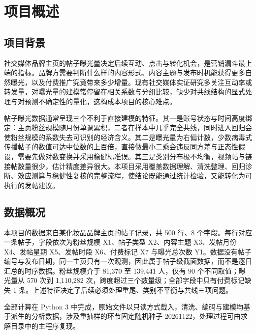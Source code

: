 \section{项目概述}
\subsection{项目背景}

社交媒体品牌主页的帖子曝光量决定后续互动、点击与转化机会，是营销漏斗最上端的指标。品牌方需要判断什么样的内容形式、内容主题与发布时机能获得更多自然曝光，以及付费推广究竟带来多少增量。现有社交媒体实证研究多关注互动率或转发量，对曝光量的建模常停留在相关系数与分组比较，缺少对共线结构的显式处理与对预测不确定性的量化，这构成本项目的核心难点。

帖子曝光数据通常呈现三个不利于直接建模的特征。其一是账号状态与时间高度绑定：主页粉丝规模随月份单调累积，二者在样本中几乎完全共线，同时进入回归会使粉丝规模的系数失去可识别的经济含义\cite{belsley1980}。其二是曝光量为右偏计数，少数病毒式传播帖子的数值可达中位数的上百倍，直接做最小二乘会违反同方差与正态性假设，需要先做对数变换并采用稳健标准误\cite{wooldridge2019}。其三是类别分布极不均衡，视频帖与链接帖数量很少，估计精度差异很大。本项目采用覆盖数据理解、清洗整理、回归诊断、效应测算与稳健性复核的完整流程，使结论既能通过统计检验，又能转化为可执行的发帖建议。

\subsection{数据概况}

本项目的数据来自某化妆品品牌主页的帖子记录，共 500 行、8 个字段。每行对应一条帖子，字段依次为粉丝规模 X1、帖子类型 X2、内容主题 X3、发帖月份 X4、发帖星期 X5、发帖时段 X6、付费标记 X7 与曝光总次数 Y1。数据没有帖子编号与发布日期，同一主页只有一次观测，因此属于帖子级截面数据，而不是逐日汇总的时序数据。粉丝规模介于 81,370 至 139,441 人，仅有 90 个不同取值；曝光量从 570 次到 1,110,282 次，跨度超过三个数量级；全部字段中只有付费标记缺失 1 条。上述特征决定了后续必须处理重尾、类别不平衡与共线三项问题。

全部计算在 Python 3 中完成，原始文件以只读方式载入，清洗、编码与建模均基于派生的分析数据，涉及重抽样的环节固定随机种子 20261122，处理过程可由求解目录中的主程序复现。
